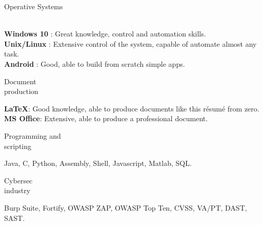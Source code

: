 \begin{minipage}{.3\textwidth}
	\flushright Operative Systems \\ \faWindows \ \faLinux \ \faApple \ \faAndroid
\end{minipage}
\hfill
\begin{minipage}{.65\textwidth}
	\vfill
	\textbf{Windows 10} \faWindows : Great knowledge, control and automation skills. 
	\\
	\textbf{Unix/Linux} \faLinux : Extensive control of the system, capable of automate almost any task.
	\\
	\textbf{Android} \faAndroid : Good, able to build from scratch simple apps.  
	\vfill
\end{minipage}

\bigskip

\begin{minipage}{.3\textwidth}
	\flushright Document \\ production \faBook 
\end{minipage}
\hfill
\begin{minipage}{.65\textwidth}
	\vfill
	\textbf{\LaTeX}: Good knowledge, able to produce documents like this résumé from zero.
	\\
	\textbf{MS Office}: Extensive, able to produce a professional document.
	\vfill
\end{minipage}

\bigskip

\begin{minipage}{.3\textwidth}
	\flushright Programming and \\ scripting \faTerminal
\end{minipage}
\hfill
\begin{minipage}{.65\textwidth}
	\vfill
	Java, C, Python, Assembly, Shell, Javascript, Matlab, SQL. 
	\vfill
\end{minipage}

\bigskip

\begin{minipage}{.3\textwidth}
	\flushright Cybersec \\ industry \faExpeditedssl
\end{minipage}
\hfill
\begin{minipage}{.64\textwidth}
	\vfill
	Burp Suite, Fortify, OWASP ZAP, OWASP Top Ten, CVSS, VA/PT, DAST, SAST.
	\vfill
\end{minipage}